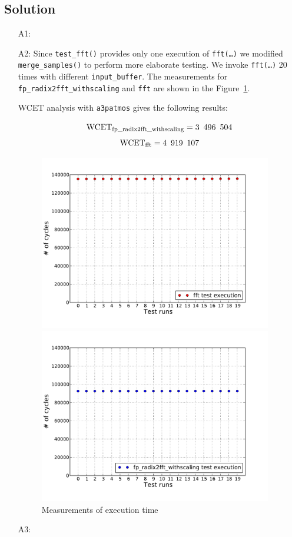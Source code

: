 \documentclass[12pt,a4paper,titlepage,oneside]{article}
\begin{document}
\subsection{Solution}
\begin{itemize}
\item[A1:] 

\item[A2:] 
  Since \texttt{test\_fft()} provides only one execution of
  \texttt{fft(\ldots)} we modified  \texttt{merge\_samples()} to
  perform more elaborate testing. We invoke \texttt{fft(\ldots)} 20 times
  with different \texttt{input\_buffer}.
  The measurements for \texttt{fp\_radix2fft\_withscaling} and \texttt{fft} are
  shown in the Figure~\ref{fig:fft_radix}.
  
  WCET analysis with \texttt{a3patmos} gives the following results:

  $$\text{WCET}_{\text{fp\_radix2fft\_withscaling}} = 3\enskip 496\enskip 504$$
  $$\text{WCET}_{\text{fft}} = 4\enskip 919\enskip 107$$

\begin{figure}[hb!]
\centering
  \begin{minipage}{0.8\textwidth}
	\includegraphics[width=4in]{fft_test}
  \end{minipage}
  \begin{minipage}{0.8\textwidth}
	\includegraphics[width=4in]{radix2fft}
  \end{minipage}
\caption{Measurements of execution time}
\label{fig:fft_radix}
\end{figure}


\item[A3:] 

\end{itemize}
\end{document}
